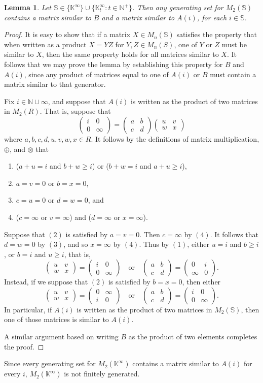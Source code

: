 \documentclass[11pt]{article}
\newtheorem{lemma}[thm]{Lemma}
\numberwithin{equation}{section}
\newcommand{\set}[2]{\ensuremath{\{#1 : #2 \}}}
\renewcommand{\S}{\mathbb{S}}
\newcommand{\N}{\mathbb{N}}
\newcommand{\Np}{\N^{+}}
\newcommand{\K}{\mathbb{K}}
\newcommand{\Kmin}{\K^{\infty}}
\newcommand{\Kmint}{\K^{\infty}_t}
\newcommand{\mat}[4]{\begin{pmatrix}#1&#2\\#3&#4\end{pmatrix}}
\begin{document}
\begin{lemma}
  Let $\S \in \{\Kmin\} \cup \set{\Kmint}{t \in \Np}$. Then any generating set
  for $M_{2}(\S)$ contains a matrix similar to $B$ and a matrix similar to
  $A(i)$, for each $i \in \S$.
\end{lemma}
\begin{proof}
It is easy to show that if a matrix $X \in M_n(\S)$ satisfies the property that
when written as a product $X = YZ$ for $Y, Z \in M_n(S)$, one of $Y$ or $Z$ must
be similar to $X$, then the same property holds for all matrices similar to $X$.
It follows that we may prove the lemma by establishing this property for $B$ and
$A(i)$, since any product of matrices equal to one of $A(i)$ or $B$ must contain
a matrix similar to that generator.

Fix $i \in \N\cup\infty$, and suppose that $A(i)$ is written as the product of
two matrices in $M_{2}(R)$. That is, suppose that 
\[\mat{i}{0}{0}{\infty} = \mat{a}{b}{c}{d} \mat{u}{v}{w}{x}\] 
where $a,b,c,d,u,v,w,x \in R$. It follows by
the definitions of matrix multiplication, $\oplus$, and $\otimes$ that
\begin{enumerate}[label=(\theenumi)]
  \item
    ($a + u = i$ and $b + w \geq i$) or ($b + w = i$ and $a + u \geq i$),
  \item
    $a = v = 0$ or $b = x = 0$,
  \item
    $c = u = 0$ or $d = w = 0$, and
  \item
    ($c = \infty$ or $v = \infty$) and ($d = \infty$ or $x = \infty$).
\end{enumerate}
Suppose that $(2)$ is satisfied by $a = v = 0$. Then $c = \infty$ by $(4)$.  It
follows that $d = w = 0$ by $(3)$, and so $x = \infty$ by $(4)$.  Thus by $(1)$,
either $u = i$ and $b \geq i$, or $b = i$ and $u \geq i$, that is,\
$$\mat{u}{v}{w}{x} = \mat{i}{0}{0}{\infty} \quad \text{or} \quad
\mat{a}{b}{c}{d} = \mat{0}{i}{\infty}{0}.$$
Instead, if we suppose that $(2)$ is satisfied by $b = x = 0$, then either
$$\mat{u}{v}{w}{x} = \mat{0}{\infty}{i}{0} \quad \text{or} \quad
\mat{a}{b}{c}{d} = \mat{i}{0}{0}{\infty}.$$
In particular, if $A(i)$ is written as the product of two matrices in
$M_{2}(\S)$, then one of those matrices is similar to $A(i)$.

A similar argument based on writing $B$ as the product of two elements completes
the proof.
\end{proof}

Since every generating set for $M_2(\Kmin)$ contains a matrix similar to $A(i)$
for every $i$, $M_2(\Kmin)$ is not finitely generated.
\end{document}
